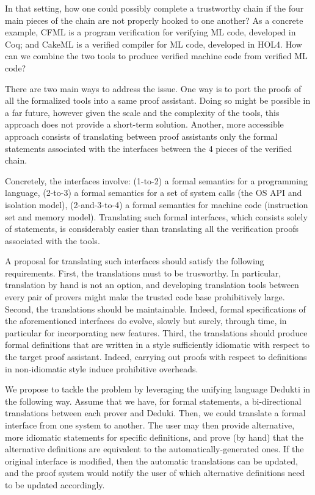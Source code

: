 \begin{workpackage}[id=libraries,wphases=0-48,type=RTD,
  short=Libraries,%
  title=Libraries,
  lead=Inr,
  InrRM=10,
  TumRM=39]
In that setting, how one could possibly complete a trustworthy chain if
the four main pieces of the chain are not properly hooked to one another?
As a concrete example, CFML is a program verification for verifying ML code,
developed in Coq; and CakeML is a verified compiler for ML code,
developed in HOL4. How can we combine the two tools to produce verified
machine code from verified ML code?

There are two main ways to address the issue. One way is to port the
proofs of all the formalized tools into a same proof assistant.
Doing so might be possible in a far future, however given the scale and
the complexity of the tools, this approach does not provide a short-term
solution. Another, more accessible approach consists of translating
between proof assistants only the formal statements associated with the
interfaces between the 4 pieces of the verified chain.

Concretely, the interfaces involve: (1-to-2) a formal semantics for
a programming language, (2-to-3) a formal semantics for a set of
system calls (the OS API and isolation model), (2-and-3-to-4) a formal
semantics for machine code (instruction set and memory model).
Translating such formal interfaces, which consists solely of statements,
is considerably easier than translating all the verification proofs
associated with the tools.

A proposal for translating such interfaces should satisfy the following
requirements. First, the translations must to be trusworthy. In particular,
translation by hand is not an option, and developing translation tools
between every pair of provers might make the trusted code base prohibitively
large. Second, the translations should be maintainable. Indeed,
formal specifications of the aforementioned interfaces do evolve, slowly but
surely, through time, in particular for incorporating new features.
Third, the translations should produce formal definitions that are written
in a style sufficiently idiomatic with respect to the target proof assistant.
Indeed, carrying out proofs with respect to definitions in non-idiomatic
style induce prohibitive overheads.

We propose to tackle the problem by leveraging the unifying language
Dedukti in the following way. Assume that we have, for formal statements,
a bi-directional translations between each prover and Deduki. Then,
we could translate a formal interface from one system to another.
The user may then provide alternative, more idiomatic statements for
specific definitions, and prove (by hand) that the alternative definitions
are equivalent to the automatically-generated ones. If the original
interface is modified, then the automatic translations can be updated,
and the proof system would notify the user of which alternative definitions
need to be updated accordingly.


\end{workpackage}
